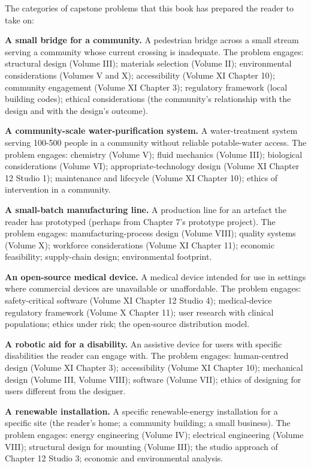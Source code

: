 The categories of capstone problems that this book has prepared the reader to take on:

\textbf{A small bridge for a community.} A pedestrian bridge across a small stream serving a community whose current crossing is inadequate. The problem engages: structural design (Volume III); materials selection (Volume II); environmental considerations (Volumes V and X); accessibility (Volume XI Chapter 10); community engagement (Volume XI Chapter 3); regulatory framework (local building codes); ethical considerations (the community's relationship with the design and with the design's outcome).

\textbf{A community-scale water-purification system.} A water-treatment system serving 100-500 people in a community without reliable potable-water access. The problem engages: chemistry (Volume V); fluid mechanics (Volume III); biological considerations (Volume VI); appropriate-technology design (Volume XI Chapter 12 Studio 1); maintenance and lifecycle (Volume XI Chapter 10); ethics of intervention in a community.

\textbf{A small-batch manufacturing line.} A production line for an artefact the reader has prototyped (perhaps from Chapter 7's prototype project). The problem engages: manufacturing-process design (Volume VIII); quality systems (Volume X); workforce considerations (Volume XI Chapter 11); economic feasibility; supply-chain design; environmental footprint.

\textbf{An open-source medical device.} A medical device intended for use in settings where commercial devices are unavailable or unaffordable. The problem engages: safety-critical software (Volume XI Chapter 12 Studio 4); medical-device regulatory framework (Volume X Chapter 11); user research with clinical populations; ethics under risk; the open-source distribution model.

\textbf{A robotic aid for a disability.} An assistive device for users with specific disabilities the reader can engage with. The problem engages: human-centred design (Volume XI Chapter 3); accessibility (Volume XI Chapter 10); mechanical design (Volume III, Volume VIII); software (Volume VII); ethics of designing for users different from the designer.

\textbf{A renewable installation.} A specific renewable-energy installation for a specific site (the reader's home; a community building; a small business). The problem engages: energy engineering (Volume IV); electrical engineering (Volume VIII); structural design for mounting (Volume III); the studio approach of Chapter 12 Studio 3; economic and environmental analysis.

